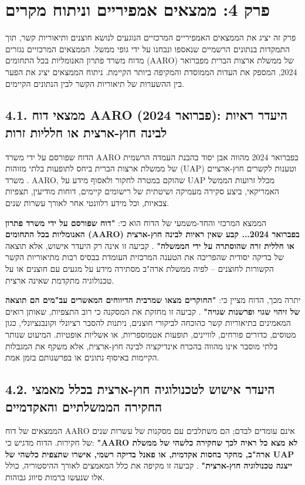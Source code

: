 \documentclass[12pt,a4paper]{article}
\begin{document}
\section{פרק 4: ממצאים אמפיריים וניתוח מקרים}
פרק זה יציג את הממצאים האמפיריים המרכזיים הנוגעים לנושא חוצנים ותיאוריות קשר, תוך התמקדות בנתונים הרשמיים שנאספו ונבחנו על ידי גופי ממשל. הממצאים המרכזיים נגזרים מדוח משרד פתרון האנומליות בכל התחומים (AARO) של ממשלת ארצות הברית מפברואר 2024, המספק את העדות הממוסדת והמקיפה ביותר הקיימת. ניתוח הממצאים יציג את הפער בין ההשערות של תיאוריות הקשר לבין הנתונים הקיימים.

\subsection{4.1. ממצאי דוח AARO (פברואר 2024): היעדר ראיות לבינה חוץ-ארצית או חלליות זרות}
הדוח שפורסם על ידי משרד AARO בפברואר 2024 מהווה אבן יסוד בהבנת העמדה הרשמית של ממשלת ארצות הברית ביחס לתופעות בלתי מזוהות (UAP) וטענות לקשרים חוץ-ארציים \cite{1, 2, 6}. משרד AARO, שהוקם במטרה לחקור ולאסוף מידע על UAP מכלל זרועות הממשל האמריקאי, ביצע סקירה מעמיקה ושיטתית של רישומים קיימים, דוחות מודיעין, תצפיות צבאיות, וכל מידע רלוונטי אחר לאורך עשרות שנים.

הממצא המרכזי והחד-משמעי של הדוח הוא כי: \textbf{"דוח שפורסם על ידי משרד פתרון האנומליות בכל התחומים (AARO) בפברואר 2024... קבע שאין ראיות לבינה חוץ-ארצית או חללית זרה שהוסתרה על ידי הממשלה"} \cite{1, 6}. קביעה זו אינה רק היעדר אישוש, אלא תוצאה של בדיקה יסודית שהפריכה את הטענה המרכזית העומדת בבסיס רבות מתיאוריות הקשר הקשורות לחוצנים – לפיה ממשלת ארה"ב מסתירה מידע על מגעים עם חוצנים או על טכנולוגיה מתקדמת שאינה ארצית.

יתרה מכך, הדוח מציין כי: \textbf{"החוקרים מצאו שמרבית הדיווחים המאשרים עב"מים הם תוצאה של זיהוי שגוי ופרשנות שגויה"} \cite{1, 6}. קביעה זו מחזקת את המסקנה כי רוב התצפיות, שאותן רואים המאמינים בתיאוריות קשר כהוכחה לביקורי חוצנים, ניתנות להסבר רציונלי וקונבנציונלי, כגון מטוסים, כדורים פורחים, לוויינים, תופעות אטמוספריות, או אשליות אופטיות. המיעוט שנותר בלתי מוסבר אינו מהווה בהכרח אינדיקציה לבינה חוץ-ארצית, אלא משקף את המגבלות הקיימות באיסוף נתונים או בפרשנותם בזמן אמת.

\subsection{4.2. היעדר אישוש לטכנולוגיה חוץ-ארצית בכלל מאמצי החקירה הממשלתיים והאקדמיים}
הממצאים של דוח AARO אינם עומדים לבדם; הם משתלבים עם מסקנות של עשרות שנים של חקירות. הדוח מדגיש כי: \textbf{"AARO לא מצא כל ראיה לכך שחקירה כלשהי של ממשלת ארה"ב, מחקר בחסות אקדמית, או פאנל בדיקה רשמי, אישרו שתצפית כלשהי של UAP ייצגה טכנולוגיה חוץ-ארצית"} \cite{2, 6}. קביעה זו מקיפה את כלל המאמצים לאורך ההיסטוריה, כולל אלו שנעשו ברמות סיווג גבוהות.
\end{document}

